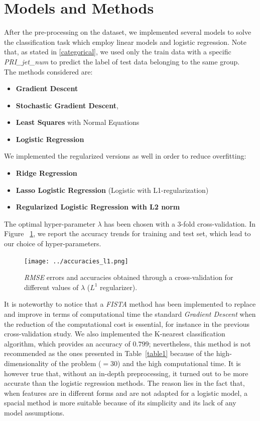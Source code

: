 \documentclass[10pt,conference,compsocconf]{IEEEtran}
\begin{document}
\section{Models and Methods}
\label{models}
After the pre-processing on the dataset, we implemented several models to solve the classification task which employ linear models and logistic regression.
Note that, as stated in \ref{categorical}, we used only the train data with a specific \emph{PRI\_jet\_num} to predict the label of test data belonging to the same group. \\
The methods considered are:
\begin{itemize}
    \item \textbf{Gradient Descent}
    \item \textbf{Stochastic Gradient Descent}, 
    \item \textbf{Least Squares} with Normal Equations
    \item \textbf{Logistic Regression}
    \end{itemize}
We implemented the regularized versions as well in order to reduce overfitting:
\begin{itemize}
\item \textbf{Ridge Regression}
\item \textbf{Lasso Logistic Regression} (Logistic with L1-regularization)
\item \textbf{Regularized Logistic Regression with L2 norm}
\end{itemize}

The optimal hyper-parameter $\lambda$ has been chosen with a 3-fold cross-validation. In Figure ~\ref{reg_lambda}, we report the accuracy trends for training and test set, which lead to our choice of hyper-parameters.
\begin{center}
\vspace{-0.5cm}
\begin{figure}[h] 
		\texttt{[image: ../accuracies\_l1.png]} 
	\caption{\emph{RMSE} errors and accuracies obtained through a cross-validation for different values of $\lambda$ ($L^1$ regularizer).}
	\label{reg_lambda}
\end{figure}
\vspace{-0.5cm}
\end{center}
It is noteworthy to notice that a \emph{FISTA} method has been implemented to replace and improve in terms of computational time the standard \emph{Gradient Descent} when the reduction of the computational cost is essential, for instance in the previous cross-validation study.
\newline
\newline
We also implemented the K-nearest classification algorithm, which provides an accuracy of $0.799$; nevertheless, this method is not recommended as the ones presented in Table~\ref{table1} because of the high-dimensionality of the problem ($=30$) and the high computational time. It is however true that, without an in-depth preprocessing, it turned out to be more accurate than the logistic regression methods. The reason lies in the fact that, when features are in different forms and are not adapted for a logistic model, a spacial method is more suitable because of its simplicity and its lack of any model assumptions.
\end{document}
